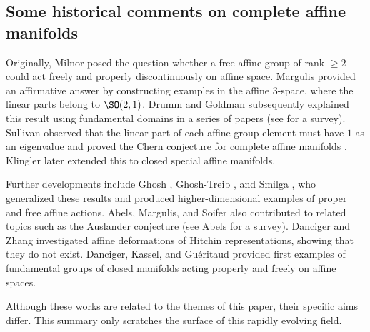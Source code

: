 \subsection{Some historical comments on complete affine manifolds} 
Originally, Milnor posed the question whether a free affine group of rank $\geq 2$ could act freely and properly discontinuously on affine space. Margulis provided an affirmative answer by constructing examples in the affine $3$-space, where the linear parts belong to $\SO(2, 1)$. Drumm and Goldman subsequently explained this result using fundamental domains in a series of papers (see \cite{DDGS} for a survey). Sullivan \cite{Sullivan76} observed that the linear part of each affine group element must have $1$ as an eigenvalue and proved the Chern conjecture for complete affine manifolds \cite{KS75}. Klingler \cite{Klingler2017} later extended this to closed special affine manifolds.

Further developments include Ghosh \cite{Ghosh17,Ghosh18,ghosh2018avatars,Ghosh23}, Ghosh-Treib \cite{GhoshTreib21}, and Smilga \cite{Smilga14,Smilga16,Smilga18,Smilga22,Smilga22ii}, who generalized these results and produced higher-dimensional examples of proper and free affine actions. Abels, Margulis, and Soifer also contributed to related topics such as the Auslander conjecture (see Abels \cite{Abels01} for a survey). Danciger and Zhang \cite{DZ2019} investigated affine deformations of Hitchin representations, showing that they do not exist. Danciger, Kassel, and Gu\'eritaud \cite{DGK2020} provided  first examples of fundamental groups of closed manifolds acting properly and freely on affine spaces.

Although these works are related to the themes of this paper, their specific aims differ. This summary only scratches the surface of this rapidly evolving field.

